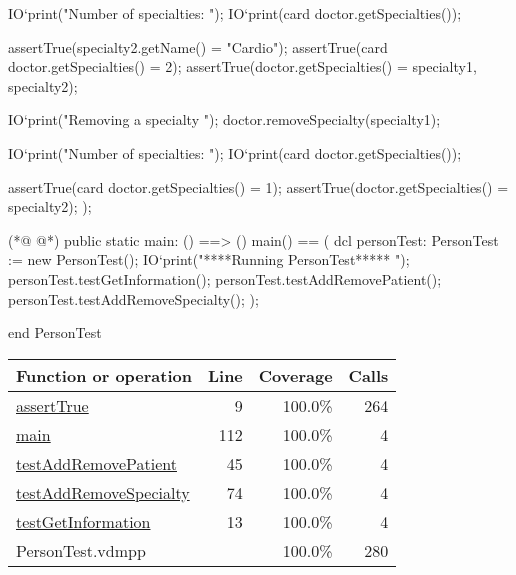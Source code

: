 \begin{vdmpp}[breaklines=true]
   IO`print("\n Number of specialties: ");
   IO`print(card doctor.getSpecialties());
   
   assertTrue(specialty2.getName() = "Cardio");
   assertTrue(card doctor.getSpecialties() = 2);
   assertTrue(doctor.getSpecialties() = {specialty1, specialty2});
   
   IO`print("\n Removing a specialty \n");
   doctor.removeSpecialty(specialty1);
   
   IO`print("\n Number of specialties: ");
   IO`print(card doctor.getSpecialties());
   
   assertTrue(card doctor.getSpecialties() = 1);
   assertTrue(doctor.getSpecialties() = {specialty2});
  );
  
(*@
\label{main:112}
@*)
 public static main: () ==> ()
   main() == (
    dcl personTest: PersonTest := new PersonTest();
    IO`print("\n *****Running PersonTest***** \n");
    personTest.testGetInformation();
    personTest.testAddRemovePatient();
    personTest.testAddRemoveSpecialty();
   );
  
end PersonTest
\end{vdmpp}
\bigskip
\begin{longtable}{|l|r|r|r|}
\hline
Function or operation & Line & Coverage & Calls \\
\hline
\hline
\hyperref[assertTrue:9]{assertTrue} & 9&100.0\% & 264 \\
\hline
\hyperref[main:112]{main} & 112&100.0\% & 4 \\
\hline
\hyperref[testAddRemovePatient:45]{testAddRemovePatient} & 45&100.0\% & 4 \\
\hline
\hyperref[testAddRemoveSpecialty:74]{testAddRemoveSpecialty} & 74&100.0\% & 4 \\
\hline
\hyperref[testGetInformation:13]{testGetInformation} & 13&100.0\% & 4 \\
\hline
\hline
PersonTest.vdmpp & & 100.0\% & 280 \\
\hline
\end{longtable}

